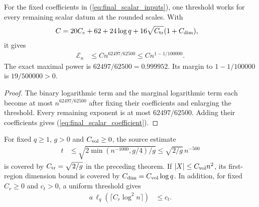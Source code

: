 \begin{lemma}
    \label{thm:arealaw-final-sharp-power}
    \leanok
    For the fixed coefficients in (\ref{eq:final_scalar_inputs}),
    one threshold works for every remaining scalar datum at the
    rounded scales. With
    \begin{align}
        C & =20C_e+62+24\log q
        +16\sqrt{C_{\rm tr}}(1+C_{\dim}),
        \label{eq:final_scalar_coefficient}
    \end{align}
    it gives
    \begin{align}
        \mathcal E_n & \leq Cn^{62497/62500}
        \leq Cn^{1-1/100000}.
        \label{eq:final_scalar_output}
    \end{align}
    The exact maximal power is $62497/62500=0.999952$.
    Its margin to $1-1/100000$ is $19/500000>0$.
\end{lemma}

\begin{proof}
    \leanok
    The binary logarithmic term and the marginal logarithmic term
    each become at most $n^{62497/62500}$ after fixing their
    coefficients and enlarging the threshold. Every remaining
    exponent is at most $62497/62500$. Adding their coefficients
    gives (\ref{eq:final_scalar_coefficient}).
\end{proof}

\begin{lemma}
    \label{thm:arealaw-final-sharp-source}
    \leanok
    For fixed $q\geq1$, $g>0$ and $C_{\rm vol}\geq0$, the source estimate
    \begin{align}
        t & \leq\sqrt{2\min(n^{-1000},g/4)/g}
        \leq\sqrt{2/g}\,n^{-500}
        \label{eq:final_scalar_trace}
    \end{align}
    is covered by $C_{\rm tr}=\sqrt{2/g}$ in the preceding theorem.
    If $|X|\leq C_{\rm vol}n^2$, its first-region dimension bound
    is covered by $C_{\dim}=C_{\rm vol}\log q$.
    In addition, for fixed $C_r\geq0$ and $c_t>0$, a uniform
    threshold gives
    \begin{align}
        a\,\ell_q(\lceil C_r\log^2n\rceil) & \leq c_t.
        \label{eq:final_scalar_transport}
    \end{align}
\end{lemma}

